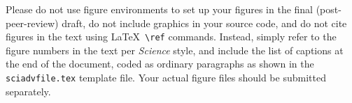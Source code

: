 \documentclass[12pt]{article}
\begin{document}


\clearpage

 Please do not use figure environments to set
up your figures in the final (post-peer-review) draft, do not include graphics in your
source code, and do not cite figures in the text using \LaTeX\
\verb+\ref+ commands.  Instead, simply refer to the figure numbers in
the text per {\it Science\/} style, and include the list of captions at
the end of the document, coded as ordinary paragraphs as shown in the
\texttt{sciadvfile.tex} template file.  Your actual figure files should
be submitted separately.
\end{document}
